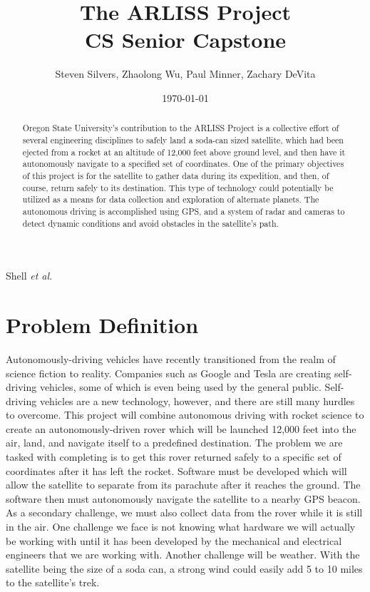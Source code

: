 \documentclass[10pt,onecolumn,draftclsnofoot,journal]{IEEEtran}
\title{The ARLISS Project \\
	\large CS Senior Capstone}
\author{Steven Silvers, Zhaolong Wu, Paul Minner, Zachary DeVita}
\date{\today}
\begin{document}

%
{Shell \MakeLowercase{\textit{et al.}}}
\maketitle
\begin{abstract}
\noindent Oregon State University's contribution to the ARLISS Project is a collective effort of several engineering disciplines to safely land a soda-can sized satellite, which had been ejected from a rocket at an altitude of 12,000 feet above ground level, and then have it autonomously navigate to a specified set of coordinates. One of the primary objectives of this project is for the satellite to gather data during its expedition, and then, of course, return safely to its destination. This type of technology could potentially be utilized as a means for data collection and exploration of alternate planets. The autonomous driving is accomplished using GPS, and a system of radar and cameras to detect dynamic conditions and avoid obstacles in the satellite's path.
\end{abstract}


\clearpage


\newpage
{}

\section*{\textbf{Problem Definition}}
\noindent Autonomously-driving vehicles have recently transitioned from the realm of science fiction to reality. Companies such as Google and Tesla are creating self-driving vehicles, some of which is even being used by the general public. Self-driving vehicles are a new technology, however, and there are still many hurdles to overcome. This project will combine autonomous driving with rocket science to create an autonomously-driven rover which will be launched 12,000 feet into the air, land, and navigate itself to a predefined destination. The problem we are tasked with completing is to get this rover returned safely to a specific set of coordinates after it has left the rocket. Software must be developed which will allow the satellite to separate from its parachute after it reaches the ground. The software then must autonomously navigate the satellite to a nearby GPS beacon. As a secondary challenge, we must also collect data from the rover while it is still in the air. One challenge we face is not knowing what hardware we will actually be working with until it has been developed by the mechanical and electrical engineers that we are working with. Another challenge will be weather. With the satellite being the size of a soda can, a strong wind could easily add 5 to 10 miles to the satellite’s trek.
\end{document}
